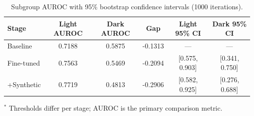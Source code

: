 \begin{table}[htbp]
\centering
\caption{Subgroup AUROC with 95\% bootstrap confidence intervals (1000 iterations).}
\label{tab:subgroup_auroc}
\begin{tabular}{lccccc}
\toprule
\textbf{Stage} & Light AUROC & Dark AUROC & Gap & Light 95\% CI & Dark 95\% CI \\
\midrule
Baseline & 0.7188 & 0.5875 & -0.1313 & --- & --- \\
Fine-tuned & 0.7563 & 0.5469 & -0.2094 & [0.575, 0.903] & [0.341, 0.750] \\
+Synthetic & 0.7719 & 0.4813 & -0.2906 & [0.582, 0.925] & [0.276, 0.688] \\
\bottomrule
\end{tabular}
\vspace{2pt}
\small{$^*$ Thresholds differ per stage; AUROC is the primary comparison metric.}
\end{table}
